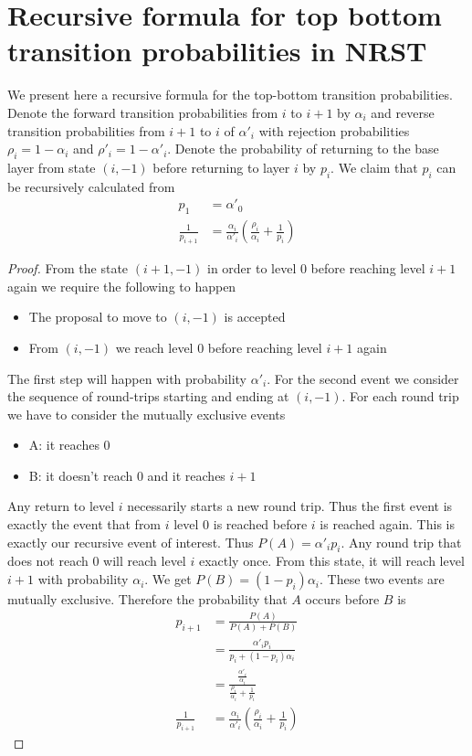 \documentclass{article}
\begin{document}
\section{Recursive formula for top bottom transition probabilities in NRST}
We present here a recursive formula for the top-bottom transition probabilities.
Denote the forward transition probabilities from $i$ to $i+1$ by $\alpha_i$ and 
reverse transition probabilities from $i+1$ to $i$ of $\alpha'_i$ with rejection
probabilities $\rho_i = 1-\alpha_i$ and $\rho'_i = 1-\alpha'_i$. Denote the 
probability of returning to the base layer from state $(i,-1)$ before returning
to layer $i$ by $p_i$. We claim that $p_i$ can be recursively calculated from
\begin{align*}
    p_1 &= \alpha'_0 \\
    \frac{1}{p_{i+1}} &=
    \frac{\alpha_i}{\alpha'_i}\left(\frac{\rho_i}{\alpha_i}+\frac{1}{p_i}\right)
\end{align*}
\begin{proof}
    From the state $(i+1,-1)$ in order to level $0$ before reaching level $i+1$
    again we require the following to happen \begin{itemize}
        \item The proposal to move to $(i,-1)$ is accepted
        \item From $(i,-1)$ we reach level $0$ before reaching level $i+1$ again
    \end{itemize}
    The first step will happen with probability $\alpha'_i$. For the second
    event we consider the sequence of round-trips starting and ending at $(i,-1)$.
    For each round trip we have to consider the mutually exclusive events \begin{itemize}
        \item A: it reaches $0$
        \item B: it doesn't reach $0$ and it reaches $i+1$
    \end{itemize}
    Any return to level $i$ necessarily starts a new round trip. Thus the first
    event is exactly the event that from $i$ level $0$ is reached before $i$ is
    reached again. This is exactly our recursive event of interest. Thus 
    $P(A)=\alpha'_i p_i$.  Any round trip that does not reach $0$ will reach
    level $i$ exactly once. From this state, it will reach level $i+1$ with
    probability $\alpha_i$. We get $P(B)=(1-p_i)\alpha_i$. These two events are
    mutually exclusive. Therefore the probability that $A$ occurs before $B$
    is \begin{align*}
        p_{i+1} &= \frac{P(A)}{P(A)+P(B)} \\
        &= \frac{\alpha'_i p_i}{p_i+(1-p_i)\alpha_i} \\
        &= \frac{\frac{\alpha'_i}{\alpha_i}}{\frac{\rho_i}{\alpha_i}+\frac{1}{p_i}} \\
        \frac{1}{p_{i+1}} &=
        \frac{\alpha_i}{\alpha'_i}\left(\frac{\rho_i}{\alpha_i}+\frac{1}{p_i}\right)
    \end{align*}
\end{proof}
\end{document}

